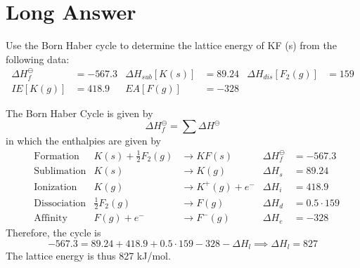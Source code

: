 \documentclass[answers]{exam}
\begin{document}

\bigskip
\section{Long Answer}
\begin{questions}

\question Use the Born Haber cycle to determine the lattice energy of KF (s) from the following data:
\begin{align*}
  \Delta H_f^\ominus &= - 567.3 & \Delta H_{sub} [K(s)] &= 89.24 & \Delta H_{dis} [F_2(g)] &= 159 \\
  IE[K(g)] &= 418.9 & EA[F(g)] &= -328
\end{align*}
\begin{solutionbox}{3.2in}
  The Born Haber Cycle is given by \begin{equation*}
    \Delta H_f^\ominus = \sum \Delta H^\ominus
  \end{equation*}
  in which the enthalpies are given by
  \begin{align*}
    & \text{Formation} & K(s) + \textstyle\frac{1}{2} F_2(g) &\to KF(s) & \Delta H_f^\ominus &= -567.3 \\
    & \text{Sublimation} & K(s) &\to K(g) & \Delta H_s &= 89.24 \\
    & \text{Ionization} & K(g) &\to K^+(g) + e^- & \Delta H_i &= 418.9 \\
    & \text{Dissociation} & \textstyle\frac{1}{2} F_2 (g) &\to F(g) & \Delta H_d &= 0.5 \cdot 159 \\
    & \text{Affinity} & F(g) + e^- &\to F^- (g) & \Delta H_e &= -328
  \end{align*}
  Therefore, the cycle is \begin{equation*}
    -567.3 = 89.24 + 418.9 + 0.5 \cdot 159 - 328 - \Delta H_l \implies \Delta H_l = 827
  \end{equation*}
  The lattice energy is thus 827 kJ/mol.
\end{solutionbox}


\end{questions}
\end{document}
